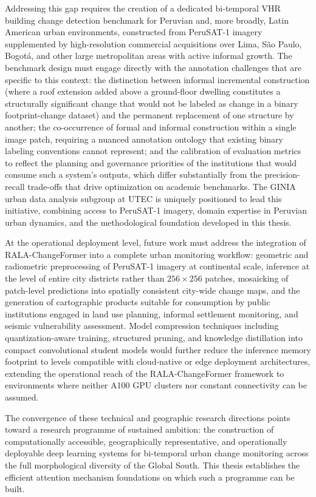 Addressing this gap requires the creation of a dedicated bi-temporal \ac{VHR} building change detection benchmark for Peruvian and, more broadly, Latin American urban environments, constructed from PeruSAT-1 imagery supplemented by high-resolution commercial acquisitions over Lima, São Paulo, Bogotá, and other large metropolitan areas with active informal growth. The benchmark design must engage directly with the annotation challenges that are specific to this context: the distinction between informal incremental construction (where a roof extension added above a ground-floor dwelling constitutes a structurally significant change that would not be labeled as change in a binary footprint-change dataset) and the permanent replacement of one structure by another; the co-occurrence of formal and informal construction within a single image patch, requiring a nuanced annotation ontology that existing binary labeling conventions cannot represent; and the calibration of evaluation metrics to reflect the planning and governance priorities of the institutions that would consume such a system's outputs, which differ substantially from the precision-recall trade-offs that drive optimization on academic benchmarks. The GINIA urban data analysis subgroup at UTEC is uniquely positioned to lead this initiative, combining access to PeruSAT-1 imagery, domain expertise in Peruvian urban dynamics, and the methodological foundation developed in this thesis.

At the operational deployment level, future work must address the integration of RALA-ChangeFormer into a complete urban monitoring workflow: geometric and radiometric preprocessing of PeruSAT-1 imagery at continental scale, inference at the level of entire city districts rather than $256 \times 256$ patches, mosaicking of patch-level predictions into spatially consistent city-wide change maps, and the generation of cartographic products suitable for consumption by public institutions engaged in land use planning, informal settlement monitoring, and seismic vulnerability assessment. Model compression techniques including quantization-aware training, structured pruning, and knowledge distillation into compact convolutional student models would further reduce the inference memory footprint to levels compatible with cloud-native or edge deployment architectures, extending the operational reach of the RALA-ChangeFormer framework to environments where neither A100 \ac{GPU} clusters nor constant connectivity can be assumed.

The convergence of these technical and geographic research directions points toward a research programme of sustained ambition: the construction of computationally accessible, geographically representative, and operationally deployable deep learning systems for bi-temporal urban change monitoring across the full morphological diversity of the Global South. This thesis establishes the efficient attention mechanism foundations on which such a programme can be built.